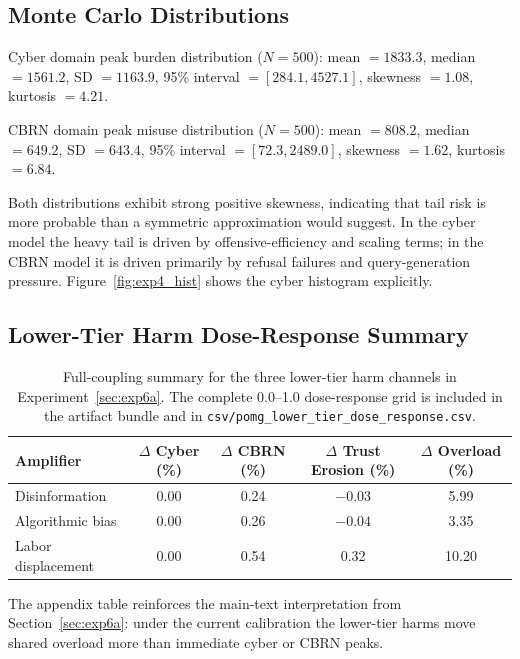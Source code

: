 \documentclass[11pt]{article}
\begin{document}
\subsection{Monte Carlo Distributions}

Cyber domain peak burden distribution ($N = 500$): mean $= 1833.3$, median $= 1561.2$, SD $= 1163.9$, 95\% interval $= [284.1, 4527.1]$, skewness $= 1.08$, kurtosis $= 4.21$.

CBRN domain peak misuse distribution ($N = 500$): mean $= 808.2$, median $= 649.2$, SD $= 643.4$, 95\% interval $= [72.3, 2489.0]$, skewness $= 1.62$, kurtosis $= 6.84$.

Both distributions exhibit strong positive skewness, indicating that tail risk is more probable than a symmetric approximation would suggest. In the cyber model the heavy tail is driven by offensive-efficiency and scaling terms; in the CBRN model it is driven primarily by refusal failures and query-generation pressure. Figure~\ref{fig:exp4_hist} shows the cyber histogram explicitly.

\subsection{Lower-Tier Harm Dose-Response Summary}

\begin{table}[H]
\centering
\caption{Full-coupling summary for the three lower-tier harm channels in Experiment~\ref{sec:exp6a}. The complete 0.0--1.0 dose-response grid is included in the artifact bundle and in \texttt{csv/pomg\_lower\_tier\_dose\_response.csv}.}
\small
\begin{tabular}{@{}lcccc@{}}
\toprule
\textbf{Amplifier} & \textbf{$\Delta$ Cyber (\%)} & \textbf{$\Delta$ CBRN (\%)} & \textbf{$\Delta$ Trust Erosion (\%)} & \textbf{$\Delta$ Overload (\%)} \\
\midrule
Disinformation & 0.00 & 0.24 & $-0.03$ & 5.99 \\
Algorithmic bias & 0.00 & 0.26 & $-0.04$ & 3.35 \\
Labor displacement & 0.00 & 0.54 & 0.32 & 10.20 \\
\bottomrule
\end{tabular}
\end{table}

The appendix table reinforces the main-text interpretation from Section~\ref{sec:exp6a}: under the current calibration the lower-tier harms move shared overload more than immediate cyber or CBRN peaks.
\end{document}
